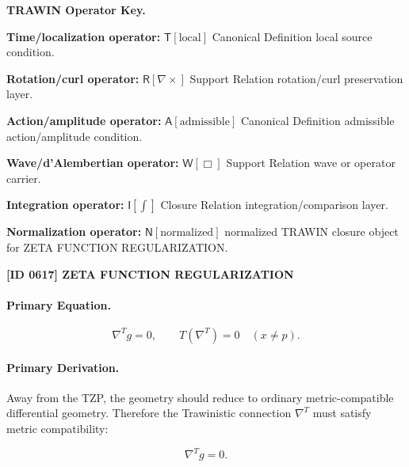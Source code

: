 \par\vspace{0.45\baselineskip}
\noindent\begin{minipage}[t]{\linewidth}
\begingroup
\small
\raggedright
\textbf{TRAWIN Operator Key.}\par
\noindent\textbf{Time/localization operator:} $\mathsf{T}\!\left[\mathrm{local}\right]$ Canonical Definition local source condition.\par
\noindent\textbf{Rotation/curl operator:} $\mathsf{R}\!\left[\nabla\times\right]$ Support Relation rotation/curl preservation layer.\par
\noindent\textbf{Action/amplitude operator:} $\mathsf{A}\!\left[\mathrm{admissible}\right]$ Canonical Definition admissible action/amplitude condition.\par
\noindent\textbf{Wave/d'Alembertian operator:} $\mathsf{W}\!\left[\Box\right]$ Support Relation wave or operator carrier.\par
\noindent\textbf{Integration operator:} $\mathsf{I}\!\left[\int\right]$ Closure Relation integration/comparison layer.\par
\noindent\textbf{Normalization operator:} $\mathsf{N}\!\left[\mathrm{normalized}\right]$ normalized TRAWIN closure object for ZETA FUNCTION REGULARIZATION.\par
\endgroup
\end{minipage}

\clearpage
\noindent\textbf{[ID 0617] ZETA FUNCTION REGULARIZATION}\par
\vspace{0.35em}
\paragraph{Primary Equation.}
\begin{equation}
\nabla^{T}g=0,
\qquad
T(\nabla^{T})=0
\quad
(x\neq p).
\end{equation}

\paragraph{Primary Derivation.}
Away from the TZP, the geometry should reduce to ordinary metric-compatible differential geometry. Therefore the Trawinistic connection $\nabla^{T}$ must satisfy metric compatibility:

\begin{equation}
\nabla^{T}g=0 .
\end{equation}

